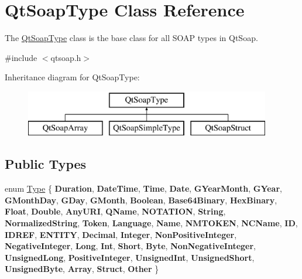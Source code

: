 \hypertarget{class_qt_soap_type}{}\section{Qt\+Soap\+Type Class Reference}
\label{class_qt_soap_type}


The \mbox{\hyperlink{class_qt_soap_type}{Qt\+Soap\+Type}} class is the base class for all S\+O\+AP types in Qt\+Soap.  




{\ttfamily \#include $<$qtsoap.\+h$>$}

Inheritance diagram for Qt\+Soap\+Type\+:\begin{figure}[H]
\begin{center}
\leavevmode
\includegraphics[height=2.000000cm]{class_qt_soap_type}
\end{center}
\end{figure}
\subsection*{Public Types}
\begin{DoxyCompactItemize}
\item 
enum \mbox{\hyperlink{class_qt_soap_type_a840b69f1d92eeb4e64ae1e0439d54683}{Type}} \{ \newline
{\bfseries Duration}, 
{\bfseries Date\+Time}, 
{\bfseries Time}, 
{\bfseries Date}, 
\newline
{\bfseries G\+Year\+Month}, 
{\bfseries G\+Year}, 
{\bfseries G\+Month\+Day}, 
{\bfseries G\+Day}, 
\newline
{\bfseries G\+Month}, 
{\bfseries Boolean}, 
{\bfseries Base64\+Binary}, 
{\bfseries Hex\+Binary}, 
\newline
{\bfseries Float}, 
{\bfseries Double}, 
{\bfseries Any\+U\+RI}, 
{\bfseries Q\+Name}, 
\newline
{\bfseries N\+O\+T\+A\+T\+I\+ON}, 
{\bfseries String}, 
{\bfseries Normalized\+String}, 
{\bfseries Token}, 
\newline
{\bfseries Language}, 
{\bfseries Name}, 
{\bfseries N\+M\+T\+O\+K\+EN}, 
{\bfseries N\+C\+Name}, 
\newline
{\bfseries ID}, 
{\bfseries I\+D\+R\+EF}, 
{\bfseries E\+N\+T\+I\+TY}, 
{\bfseries Decimal}, 
\newline
{\bfseries Integer}, 
{\bfseries Non\+Positive\+Integer}, 
{\bfseries Negative\+Integer}, 
{\bfseries Long}, 
\newline
{\bfseries Int}, 
{\bfseries Short}, 
{\bfseries Byte}, 
{\bfseries Non\+Negative\+Integer}, 
\newline
{\bfseries Unsigned\+Long}, 
{\bfseries Positive\+Integer}, 
{\bfseries Unsigned\+Int}, 
{\bfseries Unsigned\+Short}, 
\newline
{\bfseries Unsigned\+Byte}, 
{\bfseries Array}, 
{\bfseries Struct}, 
{\bfseries Other}
 \}
\end{DoxyCompactItemize}
